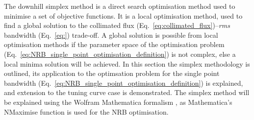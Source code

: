 \documentclass[../main.tex]{subfiles}
\begin{document}
The downhill simplex method is a direct search optimisation method used to minimise a set of objective functions. It is a local optimisation method, used to find a global solution to the collimated flux (Eq.~\ref{eq:collimated_flux})--\textit{rms} bandwidth (Eq.~\ref{eq:}) trade-off. A global solution is possible from local optimisation methods if the parameter space of the optimisation problem (Eq.~\ref{eq:NRB_single_point_optimisation_definition}) is not complex, else a local minima solution will be achieved. In this section the simplex methodology is outlined, its application to the optimsation problem for the single point bandwidth (Eq.~\ref{eq:NRB_single_point_optimisation_definition}) is explained, and extension to the tuning curve case is demonstrated. The simplex method will be explained using the Wolfram Mathematica formalism \cite{wolfram2021nmaximize}, as Mathematica's NMaximise function is used for the NRB optimisation.
\end{document}
